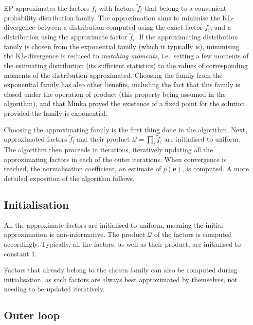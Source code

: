 \documentclass[11pt]{article}
\newcommand{\vek}[1]{\ensuremath{\mathbf{#1}}}
\newcommand{\kve}{\ensuremath{\mathcal{Q}}}
\begin{document}
EP approximates the factors $f_i$ with factors $\tilde{f}_i$ that belong to 
a convenient probability distribution family. The approximation aims to 
minimise the KL-divergence between a distribution computed using the exact 
factor $f_i$, and a distribution using the approximate factor 
$\tilde{f}_i$. If the approximating distribution family is chosen from the 
exponential family (which it typically is), minimising the KL-divergence is 
reduced to \emph{matching moments}, i.e.\ setting a few moments of the 
estimating distribution (its sufficient statistics) to the values of 
corresponding moments of the distribution approximated. Choosing the family 
from the exponential family has also other benefits, including the fact 
that this family is closed under the operation of product (this property 
being assumed in the algorithm), and that Minka
\cite{minka_expectation_2001} proved the existence of a fixed point for the 
solution provided the family is exponential.

Choosing the approximating family is the first thing done in the algorithm.  
Next, approximated factors $\tilde{f}_i$ and their product $\kve 
= \prod_i{\tilde{f}_i}$ are initialised to uniform.  The algorithm then 
proceeds in iterations, iteratively updating all the approximating factors 
in each of the outer iterations. When convergence is reached, the 
normalisation coefficient, an estimate of $p(\vek{e})$, is computed. A more 
detailed exposition of the algorithm follows.

\renewcommand{\thesubsection}{\arabic{subsection}.}
\renewcommand{\thesubsubsection}{\arabic{subsection}.\arabic{subsubsection}.}
\subsection{Initialisation}
All the approximate factors are initialised to uniform, meaning the initial 
approximation is non-informative.  The product $\kve$ of the factors is 
computed accordingly. Typically, all the factors, as well as their product, 
are initialised to constant 1.

Factors that already belong to the chosen family can also be computed 
during initialisation, as such factors are always best approximated by 
themselves, not needing to be updated iteratively.


\subsection{Outer loop}
\end{document}
